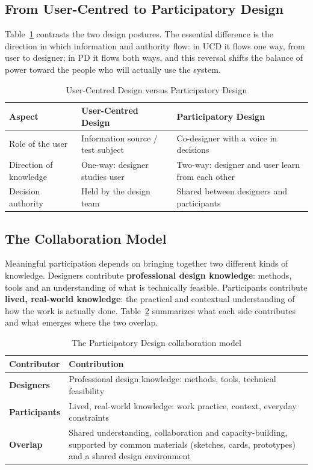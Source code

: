 \documentclass[a4paper,12pt]{article}
\begin{document}
\subsection{From User-Centred to Participatory Design}
Table~\ref{tab:ucdvspd} contrasts the two design postures. The essential difference is the direction in which information and authority flow: in UCD it flows one way, from user to designer; in PD it flows both ways, and this reversal shifts the balance of power toward the people who will actually use the system.

\begin{table}[H]
\centering
\begin{tabularx}{\textwidth}{@{}l X X@{}}
\toprule
\rowcolor{myblue!20} \textbf{Aspect} & \textbf{User-Centred Design} & \textbf{Participatory Design} \\
\midrule
Role of the user       & Information source / test subject & Co-designer with a voice in decisions \\
Direction of knowledge & One-way: designer studies user    & Two-way: designer and user learn from each other \\
Decision authority     & Held by the design team           & Shared between designers and participants \\
\bottomrule
\end{tabularx}
\caption{User-Centred Design versus Participatory Design}
\label{tab:ucdvspd}
\end{table}

\subsection{The Collaboration Model}
Meaningful participation depends on bringing together two different kinds of knowledge. Designers contribute \textbf{professional design knowledge}: methods, tools and an understanding of what is technically feasible. Participants contribute \textbf{lived, real-world knowledge}: the practical and contextual understanding of how the work is actually done. Table~\ref{tab:collab} summarizes what each side contributes and what emerges where the two overlap.

\begin{table}[H]
\centering
\begin{tabularx}{\textwidth}{@{}>{\bfseries}l X@{}}
\toprule
\rowcolor{myblue!20} Contributor & Contribution \\
\midrule
Designers    & Professional design knowledge: methods, tools, technical feasibility \\
Participants & Lived, real-world knowledge: work practice, context, everyday constraints \\
Overlap      & Shared understanding, collaboration and capacity-building, supported by common materials (sketches, cards, prototypes) and a shared design environment \\
\bottomrule
\end{tabularx}
\caption{The Participatory Design collaboration model}
\label{tab:collab}
\end{table}
\end{document}
